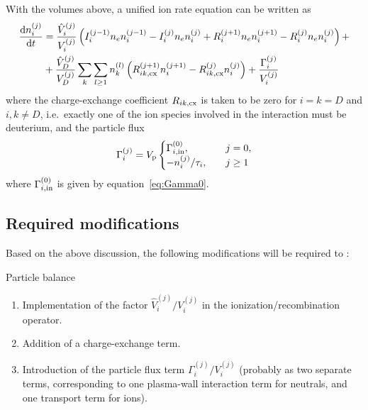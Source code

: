 \documentclass{notes}
\newcommand{\Vp}{V_{\rm p}}
\begin{document}
    With the volumes above, a unified ion rate equation can be written as
    \begin{equation}
        \begin{aligned}
            \frac{\mathrm{d} n_i^{(j)}}{\mathrm{d} t} &=
                \frac{\hat{V}_i^{(j)}}{V_i^{(j)}}\left(
                    I_i^{(j-1)}n_en_i^{(j-1)}
                    -I_i^{(j)}n_en_i^{(j)}
                    + R_i^{(j+1)}n_en_i^{(j+1)}
                    -R_i^{(j)}n_en_i^{(j)}
                \right) +\\
                &+ \frac{\hat{V}_D^{(j)}}{V_D^{(j)}}\sum_k\sum_{l\geq 1}n_k^{(l)}\left(
                    R_{ik,{\rm cx}}^{(j+1)}n_i^{(j+1)}
                    -R_{ik,{\rm cx}}^{(j)}n_i^{(j)}
                \right)
                +\frac{\Gamma_i^{(j)}}{V_i^{(j)}}
        \end{aligned}
    \end{equation}
    where the charge-exchange coefficient $R_{ik,{\rm cx}}$ is taken to be zero
    for $i=k=D$ and $i,k\neq D$, i.e.\ exactly one of the ion species involved
    in the interaction must be deuterium, and the particle flux
    \begin{equation}
        \Gamma_i^{(j)} = \Vp\begin{cases}
            \Gamma_{i,{\rm in}}^{(0)}, &\quad j=0,\\
            -n_i^{(j)}/\tau_i, &\quad j\geq 1
        \end{cases}
    \end{equation}
    where $\Gamma_{i,{\rm in}}^{(0)}$ is given by equation~\eqref{eq:Gamma0}.

    \subsection{Required modifications}
    Based on the above discussion, the following modifications will be required
    to \DREAM:
    \begin{summarybox}{Particle balance}
        \begin{enumerate}
            \item Implementation of the factor $\hat{V}_i^{(j)}/V_i^{(j)}$ in
            the ionization/recombination operator.
            \item Addition of a charge-exchange term.
            \item Introduction of the particle flux term
            $\Gamma_i^{(j)}/V_i^{(j)}$ (probably as two separate terms,
            corresponding to one plasma-wall interaction term for neutrals, and
            one transport term for ions).
        \end{enumerate}
    \end{summarybox}
\end{document}
